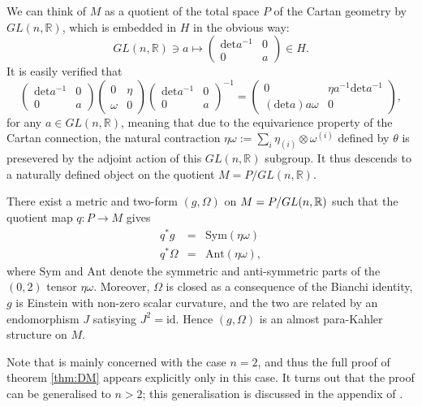 We can think of $M$ as a quotient of the total space $P$ of the
Cartan geometry by $GL(n,\mathbb{R})$, which is embedded in $H$
in the obvious way:
\[
GL(n,\mathbb{R})\ni a\longmapsto\begin{pmatrix}\mathrm{det}a^{-1} & 0\\
0 & a
\end{pmatrix}\in H.
\]
It is easily verified that 
\[
\begin{pmatrix}\mathrm{det}a^{-1} & 0\\
0 & a
\end{pmatrix}\begin{pmatrix}0 & \eta\\
\omega & 0
\end{pmatrix}\begin{pmatrix}\mathrm{det}a^{-1} & 0\\
0 & a
\end{pmatrix}^{-1}=\begin{pmatrix}0 & \eta a^{-1}\mathrm{det}a^{-1}\\
(\mathrm{det}a)a\omega & 0
\end{pmatrix},
\]
for any $a\in GL(n,\mathbb{R})$, meaning that due to the equivarience
property of the Cartan connection, the natural contraction $\eta\omega:=\sum_{i}\eta_{(i)}\otimes\omega^{(i)}$
defined by $\theta$ is presevered by the adjoint action of this $GL(n,\mathbb{R})$
subgroup. It thus descends to a naturally defined object on the quotient
$M=P/GL(n,\mathbb{R})$.

\begin{theo}{\cite{DM}}\label{thm:DM}
There exist a metric and two-form
$(g,\Omega)$ on $\mbox{\ensuremath{M=P/GL(n,\mathbb{R})}}$ such
that the quotient map $q:P\rightarrow M$ gives
\begin{eqnarray*}
q^{*}g & = & \mathrm{Sym}(\eta\omega)\\
q^{*}\Omega & = & \mathrm{Ant}(\eta\omega),
\end{eqnarray*}
where $\mathrm{Sym}$ and $\mathrm{Ant}$ denote the symmetric and
anti-symmetric parts of the $(0,2)$ tensor $\eta\omega$. Moreover,
$\Omega$ is closed as a consequence of the Bianchi identity, $g$
is Einstein with non-zero scalar curvature, and the two are related
by an endomorphism $J$ satisying $J^{2}=\mathrm{id}$. Hence $(g,\Omega)$
is an almost para-Kahler structure on $M$.
\end{theo}

Note that \cite{DM} is mainly concerned with the case $n=2$, and thus the full proof of theorem \ref{thm:DM} appears explicitly only in this case. It turns out that the proof can be generalised to $n>2$; this generalisation is discussed in the appendix of \cite{DM}.


